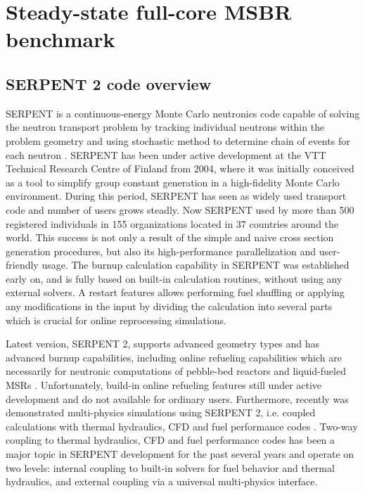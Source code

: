 \chapter[Steady-state full-core MSBR benchmark]{Steady-state full-core MSBR benchmark}

\section{SERPENT 2 code overview}

SERPENT is a continuous-energy Monte Carlo neutronics code capable of solving the neutron transport problem by tracking individual neutrons within the problem geometry and using stochastic method to determine chain of events for each neutron \cite{leppanen_serpent_2015}. SERPENT has been under active development at the VTT Technical Research Centre of Finland from 2004, where it was initially conceived as a tool to simplify group constant generation in a high-fidelity Monte Carlo environment. During this period, SERPENT has seen as widely used transport code and number of users grows steadly. Now SERPENT used by more than 500 registered individuals in 155 organizations located in 37 countries around the world. This success is not only a result of the simple and naive cross section generation procedures, but also its high-performance parallelization and user-friendly usage. The burnup calculation capability in SERPENT was established early on, and is fully based on built-in calculation routines, without using any external solvers. A restart features allows performing fuel shuffling or applying any modifications in the input by dividing the calculation into several parts which is crucial for online reprocessing simulations.

Latest version, SERPENT 2, supports advanced geometry types and has advanced burnup capabilities, including online refueling capabilities which are necessarily for neutronic computations of pebble-bed reactors and liquid-fueled \glspl{MSR} \cite{aufiero_extended_2013}. Unfortunately, build-in online refueling features still under active development and do not available for ordinary users. Furthermore, recently was demonstrated multi-physics simulations using SERPENT 2, i.e. coupled calculations with thermal hydraulics, \gls{CFD} and fuel performance codes \cite{leppanen_numerical_2015}. Two-way coupling to thermal hydraulics, CFD and fuel performance codes has been a major topic in SERPENT development for the past several years and operate on two levels: 	internal coupling to built-in solvers for fuel behavior and thermal hydraulics, and external coupling via a universal multi-physics interface. 

